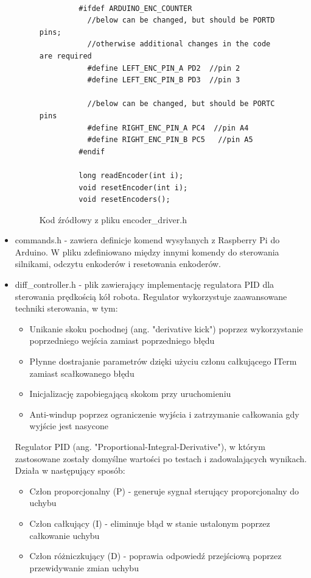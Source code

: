 \documentclass[a4paper,twoside,12pt]{book}
\begin{document}
\begin{itemize}
\begin{figure}[!hb]
\begin{lstlisting}
			
		 #ifdef ARDUINO_ENC_COUNTER
		   //below can be changed, but should be PORTD pins; 
		   //otherwise additional changes in the code are required
		   #define LEFT_ENC_PIN_A PD2  //pin 2
		   #define LEFT_ENC_PIN_B PD3  //pin 3
		   
		   //below can be changed, but should be PORTC pins
		   #define RIGHT_ENC_PIN_A PC4  //pin A4
		   #define RIGHT_ENC_PIN_B PC5   //pin A5
		 #endif
			
		 long readEncoder(int i);
		 void resetEncoder(int i);
		 void resetEncoders();
			\end{lstlisting}
			\caption{Kod źródłowy z pliku encoder\_driver.h}
			\label{fig:encoder-driver}
			\end{figure}
			
			\item commands.h - zawiera definicje komend wysyłanych z Raspberry Pi do Arduino. W pliku zdefiniowano między innymi komendy do sterowania silnikami, odczytu enkoderów i resetowania enkoderów.
			\item diff\_controller.h - plik zawierający implementację regulatora PID dla sterowania prędkością kół robota. Regulator wykorzystuje zaawansowane techniki sterowania, w tym:

			\begin{itemize}
				\item Unikanie skoku pochodnej (ang. "derivative kick") poprzez wykorzystanie poprzedniego wejścia zamiast poprzedniego błędu
				\item Płynne dostrajanie parametrów dzięki użyciu członu całkującego ITerm zamiast scałkowanego błędu
				\item Inicjalizację zapobiegającą skokom przy uruchomieniu
				\item Anti-windup poprzez ograniczenie wyjścia i zatrzymanie całkowania gdy wyjście jest nasycone
			\end{itemize}

			Regulator PID (ang. "Proportional-Integral-Derivative"), w którym zastosowane zostały domyślne wartości po testach i zadowalających wynikach.  Działa w następujący sposób:
			\begin{itemize}
				\item Człon proporcjonalny (P) - generuje sygnał sterujący proporcjonalny do uchybu
				\item Człon całkujący (I) - eliminuje błąd w stanie ustalonym poprzez całkowanie uchybu
				\item Człon różniczkujący (D) - poprawia odpowiedź przejściową poprzez przewidywanie zmian uchybu
			\end{itemize}


\end{itemize}
\end{document}
